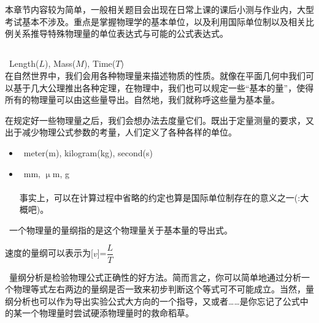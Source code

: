 \chapter[基础知识]{}
本章节内容较为简单，一般相关题目会出现在日常上课的课后小测与作业内，大型考试基本不涉及。重点是掌握物理学的基本单位，以及利用国际单位制以及相关比例关系推导特殊物理量的单位表达式与可能的公式表达式。
\section[单位与量纲]{}
\begin{Itemize}
    \item {}\ \eg Length($L$), Mass($M$), Time($T$)\\
    在自然世界中，我们会用各种物理量来描述物质的性质。就像在平面几何中我们可以基于几大公理推出各种定理，在物理中，我们也可以规定一些“基本的量”，使得所有的物理量可以由这些量导出。自然地，我们就称呼这些量为基本量。
    \item {}在规定好一些物理量之后，我们会想办法去度量它们。既出于定量测量的要求，又出于减少物理公式参数的考量，人们定义了各种各样的单位。
    \begin{itemize}
        \item {}\ \eg meter(m), kilogram(kg), second(s)
        \item {}\ \eg mm, $\upmu$m, g\\
              \\
              事实上，可以在计算过程中省略的约定也算是国际单位制存在的意义之一(\dove :大概吧)。
    \end{itemize}
    \item {}\ 一个物理量的量纲指的是这个物理量关于基本量的导出式。

    \eg 速度的量纲可以表示为[$v$]=$\dfrac{L}{T}$

    \item {}\ 量纲分析是检验物理公式正确性的好方法。简而言之，你可以简单地通过分析一个物理等式左右两边的量纲是否一致来初步判断这个等式可不可能成立。当然，量纲分析也可以作为导出实验公式大方向的一个指导，又或者……是你忘记了公式中的某一个物理量时尝试硬添物理量时的救命稻草。
\end{Itemize}
